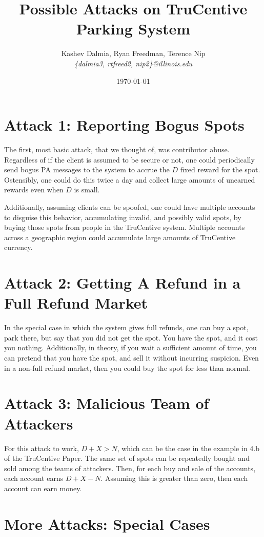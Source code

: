 \documentclass[a4paper]{article}
\title{Possible Attacks on TruCentive Parking System}
\author{Kashev Dalmia, Ryan Freedman, Terence Nip \\
        \textit{\{dalmia3, rtfreed2, nip2\}@illinois.edu}
       }
\date{\today}
\begin{document}
\maketitle

\section{Attack 1: Reporting Bogus Spots}
\label{sec:attack_1_reporting_bogus_spots}
The first, most basic attack, that we thought of, was contributor abuse.
Regardless of if the client is assumed to be secure or not, one could
periodically send bogus PA messages to the system to accrue the $D$ fixed reward
for the spot. Ostensibly, one could do this twice a day and collect large
amounts of unearned rewards even when $D$ is small.

Additionally, assuming clients can be spoofed, one could have multiple accounts
to disguise this behavior, accumulating invalid, and possibly valid spots, by
buying those spots from people in the TruCentive system. Multiple accounts
across a geographic region could accumulate large amounts of TruCentive
currency.

\section{Attack 2: Getting A Refund in a Full Refund Market}
\label{sec:attack_2_getting_a_refund_in_a_full_refund_market}
In the special case in which the system gives full refunds, one can buy a spot,
park there, but say that you did not get the spot. You have the spot, and it
cost you nothing. Additionally, in theory, if you wait a sufficient amount of
time, you can pretend that you have the spot, and sell it without incurring
suspicion. Even in a non-full refund market, then you could buy the spot for
less than normal.

\section{Attack 3: Malicious Team of Attackers}
\label{sec:attack_3_malicious_team_of_attackers}
For this attack to work, $D + X > N$, which can be the case in the example in
4.b of the TruCentive Paper. The same set of spots can be repeatedly bought and
sold among the teams of attackers. Then, for each buy and sale of the accounts,
each account earns $D + X - N$. Assuming this is greater than zero, then each
account can earn money.


\section{More Attacks: Special Cases}
\label{sec:more_attacks_special_cases}
\end{document}
